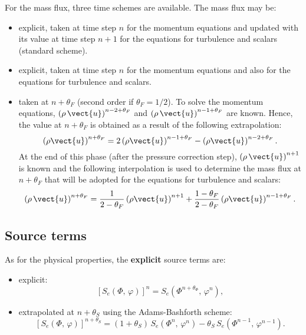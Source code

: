 For the mass flux, three time schemes are available. The mass flux may be:
%
\begin{itemize}
\item explicit, taken at time step $n$ for the momentum equations and
updated with its value at time step $n+1$ for the equations for turbulence
and scalars (standard scheme).

\item explicit, taken at time step $n$ for the momentum equations and
also for the equations for turbulence and scalars.

\item taken at $n+\theta_{F}$ (second order if $\theta_{F}=1/2$). To
solve the momentum equations, $\left(\rho\,\vect{u}\right)^{n-2+\theta_{F}}$ and 
$\left(\rho\,\vect{u}\right)^{n-1+\theta_{F}}$ are known. Hence, the value at 
$n+\theta_{F}$ is obtained as a result of the following extrapolation:
\begin{equation}
\left(\rho\vect{u}\right)^{n+\theta_{F}}
= 2 \left(\rho \vect{u}\right)^{n-1+\theta_{F}} 
- \left(\rho \vect{u}\right)^{n-2+\theta_{F}}.
\end{equation}
At the end of this phase (after the pressure correction step), 
$\left(\rho\,\vect{u}\right)^{n+1}$ is known and the following interpolation is used to
determine the mass flux at $n+\theta_{F}$ that will be adopted for the
equations for turbulence and scalars:
\begin{equation}
\left(\rho\,\vect{u}\right)^{n+\theta_{F}}= \dfrac{1}{2-\theta_{F}}
   \left(\rho \vect{u}\right)^{n+1}
+\frac{1-\theta_{F}}{2-\theta_{F}} \left(\rho \vect{u}\right)^{n-1+\theta_{F}}.
\end{equation}
\end{itemize}

\subsection{Source terms}

As for the physical properties, the \textbf{explicit} source terms are:

\begin{itemize}
\item explicit:
\begin{equation}
\left[ S_{e} \left(\Phi , \, \varphi \right) \right]^{n}=S_{e}\left(\Phi ^{n+\theta_{\Phi }}, \, \varphi^{n} \right),
\end{equation}

\item extrapolated at $n+\theta _{S}$ using the Adams-Bashforth scheme:
\begin{equation}
\left[ S_{e} \left(\Phi , \, \varphi \right) \right]^{n+\theta _{S}}=\left(1+\theta _{S}\right)\,
S_{e}\left(\Phi^{n}, \, \varphi^{n}\right)-\theta _{S}\,S_{e} \left(\Phi ^{n-1} , \,\varphi ^{n-1}\right) .
\end{equation}
\end{itemize}

